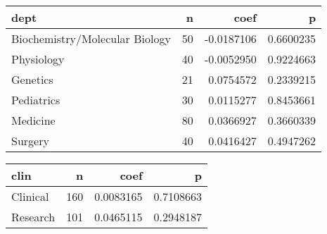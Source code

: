 \documentclass[]{article}
\newenvironment{Shaded}{\begin{snugshade}}{\end{snugshade}}
\newcommand{\DataTypeTok}[1]{\textcolor[rgb]{0.13,0.29,0.53}{#1}}
\newcommand{\DecValTok}[1]{\textcolor[rgb]{0.00,0.00,0.81}{#1}}
\newcommand{\KeywordTok}[1]{\textcolor[rgb]{0.13,0.29,0.53}{\textbf{#1}}}
\newcommand{\NormalTok}[1]{#1}
\newcommand{\OperatorTok}[1]{\textcolor[rgb]{0.81,0.36,0.00}{\textbf{#1}}}
\newcommand{\StringTok}[1]{\textcolor[rgb]{0.31,0.60,0.02}{#1}}
\begin{document}
\begin{longtable}[]{@{}lrrr@{}}
\toprule
dept & n & coef & p\tabularnewline
\midrule
\endhead
Biochemistry/Molecular Biology & 50 & -0.0187106 &
0.6600235\tabularnewline
Physiology & 40 & -0.0052950 & 0.9224663\tabularnewline
Genetics & 21 & 0.0754572 & 0.2339215\tabularnewline
Pediatrics & 30 & 0.0115277 & 0.8453661\tabularnewline
Medicine & 80 & 0.0366927 & 0.3660339\tabularnewline
Surgery & 40 & 0.0416427 & 0.4947262\tabularnewline
\bottomrule
\end{longtable}

\begin{Shaded}
\end{Shaded}

\begin{longtable}[]{@{}lrrr@{}}
\toprule
clin & n & coef & p\tabularnewline
\midrule
\endhead
Clinical & 160 & 0.0083165 & 0.7108663\tabularnewline
Research & 101 & 0.0465115 & 0.2948187\tabularnewline
\bottomrule
\end{longtable}
\end{document}
